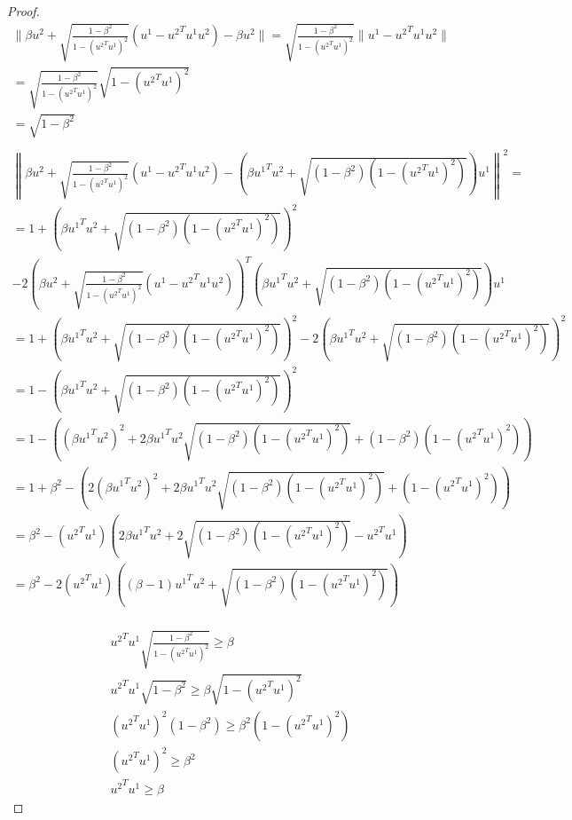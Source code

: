 \begin{proof}
\begin{align*}
\|\beta u^2 + \sqrt{\frac{1 - \beta^2}{1 - ({u^2}^Tu^1)^2}} (u^1 - {u^2}^Tu^1 u^2 ) - \beta u^2\| =
\sqrt{\frac{1 - \beta^2}{1 - ({u^2}^Tu^1)^2}}\|u^1 - {u^2}^Tu^1 u^2\|\\
= \sqrt{\frac{1 - \beta^2}{1 - ({u^2}^Tu^1)^2}}\sqrt{{1 - ({u^2}^Tu^1)^2}}\\
= \sqrt{{1 - \beta^2}}\\
\end{align*}
\begin{align*}
\left\|\beta u^2 + \sqrt{\frac{1 - \beta^2}{1 - ({u^2}^Tu^1)^2}} (u^1 - {u^2}^Tu^1 u^2 ) - \left(\beta {u^1}^Tu^2 + \sqrt{(1 - \beta^2)\left(1 - ({u^2}^Tu^1)^2\right)}\right) u^1\right\|^2 = \\
= 1 + 
\left(\beta {u^1}^Tu^2 + \sqrt{(1 - \beta^2)\left(1 - ({u^2}^Tu^1)^2\right)}\right)^2 \\
 - 2(\beta u^2 + \sqrt{\frac{1 - \beta^2}{1 - ({u^2}^Tu^1)^2}} (u^1 - {u^2}^Tu^1 u^2 ))^T\left(\beta {u^1}^Tu^2 + \sqrt{(1 - \beta^2)\left(1 - ({u^2}^Tu^1)^2\right)}\right) u^1\\
= 1 + 
\left(\beta {u^1}^Tu^2 + \sqrt{(1 - \beta^2)\left(1 - ({u^2}^Tu^1)^2\right)}\right)^2 
 - 2\left(\beta {u^1}^Tu^2 + \sqrt{(1 - \beta^2)\left(1 - ({u^2}^Tu^1)^2\right)}\right)^2\\
= 1 - \left(\beta {u^1}^Tu^2 + \sqrt{(1 - \beta^2)\left(1 - ({u^2}^Tu^1)^2\right)}\right)^2 \\
= 1 - \left(
(\beta {u^1}^Tu^2)^2
+ 2\beta {u^1}^Tu^2\sqrt{(1 - \beta^2)\left(1 - ({u^2}^Tu^1)^2\right)}
+ (1 - \beta^2)\left(1 - ({u^2}^Tu^1)^2\right)
\right) \\
= 1 + \beta^2 - \left(
2(\beta {u^1}^Tu^2)^2
+ 2\beta {u^1}^Tu^2\sqrt{(1 - \beta^2)\left(1 - ({u^2}^Tu^1)^2\right)}
+ \left(1 - ({u^2}^Tu^1)^2\right)
\right) \\
= \beta^2 - ({u^2}^Tu^1)\left(
2\beta {u^1}^Tu^2
+ 2\sqrt{(1 - \beta^2)\left(1 - ({u^2}^Tu^1)^2\right)} - {u^2}^Tu^1
\right) \\
= \beta^2 - 2({u^2}^Tu^1)\left(
(\beta - 1) {u^1}^Tu^2
+ \sqrt{(1 - \beta^2)\left(1 - ({u^2}^Tu^1)^2\right)}
\right) \\
\end{align*}


\begin{align*}
{u^2}^Tu^1\sqrt{\frac{1 - \beta^2}{1 - ({u^2}^Tu^1)^2}} \ge \beta\\
{u^2}^Tu^1\sqrt{1 - \beta^2} \ge \beta\sqrt{1 - ({u^2}^Tu^1)^2} \\
({u^2}^Tu^1)^2(1 - \beta^2) \ge \beta^2(1 - ({u^2}^Tu^1)^2) \\
({u^2}^Tu^1)^2 \ge \beta^2 \\
{u^2}^Tu^1 \ge \beta
\end{align*}




\end{proof}
